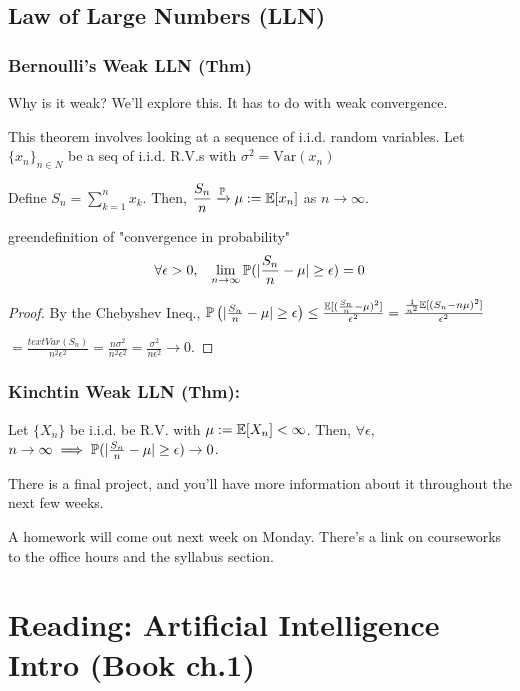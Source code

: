 \subsection{Law of Large Numbers (LLN)}

\subsubsection*{Bernoulli's Weak LLN (Thm)}

Why is it weak? We'll explore this. It has to do with weak convergence.

This theorem involves looking at a sequence of i.i.d. random variables.  Let $\{ x_n\}_{n\in N}$ be  a seq of i.i.d. R.V.s with $\sigma^2 = \text{Var}(x_n)$

Define $S_n = \sum_{k=1}^n x_k$. Then, $\dfrac{S_n}{n} \xrightarrow[]{\mathbb{P}} \mu := \mathbb{E}[x_n]$ as $n\to\infty$.

\begin{mybox}{green}{definition of "convergence in probability"}
\[\forall \epsilon > 0 , \;\;\; \lim\limits_{n\to\infty} \mathbb{P}(|\frac{S_n}{n} - \mu| \geq \epsilon) = 0 \]
\end{mybox}

\begin{proof}
By the Chebyshev Ineq., $\mathbb{P}\left( |\frac{S_n}{n} - \mu| \geq \epsilon \right)
	\leq \frac{\mathbb{E}[(\frac{S_n}{n} - \mu)^2] }{ \epsilon^2 }
= \frac{  \frac{1}{n^2} \mathbb{E}[(S_n - n\mu)^2] }{ \epsilon^2 } $

$= \frac{text{Var} (S_n) }{ n^2\epsilon^2 } = \frac{n\sigma^2}{ n^2\epsilon^2} = \frac{\sigma^2}{n\epsilon^2} \to 0$.
\end{proof}

\subsubsection*{Kinchtin Weak LLN (Thm):} Let $\{ X_n\}$ be i.i.d. be R.V. with $\mu := \mathbb{E}[X_n] < \infty$. Then, $\forall \epsilon,$ $n\to \infty \implies \mathbb{P}(|\frac{S_n}{n} - \mu| \geq \epsilon) \to 0$.



\begin{note}
There is a final project, and you'll have more information about it throughout the next few weeks.

A homework will come out next week on Monday. There's a link on courseworks to the office hours and the syllabus section.
\end{note}



\section{Reading: Artificial Intelligence Intro (Book ch.1)}

